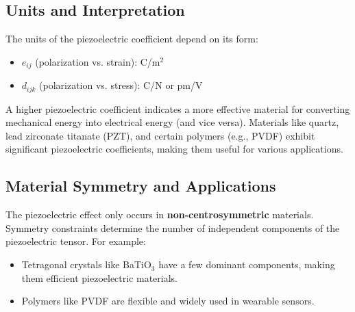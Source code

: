 \documentclass[12pt]{article}
\begin{document}
\subsection*{Units and Interpretation}
The units of the piezoelectric coefficient depend on its form:
\begin{itemize}
    \item $e_{ij}$ (polarization vs. strain): C/m$^2$
    \item $d_{ijk}$ (polarization vs. stress): C/N or pm/V
\end{itemize}

A higher piezoelectric coefficient indicates a more effective material for converting mechanical energy into electrical energy (and vice versa). Materials like quartz, lead zirconate titanate (PZT), and certain polymers (e.g., PVDF) exhibit significant piezoelectric coefficients, making them useful for various applications.

\subsection*{Material Symmetry and Applications}
The piezoelectric effect only occurs in \textbf{non-centrosymmetric} materials. Symmetry constraints determine the number of independent components of the piezoelectric tensor. For example:
\begin{itemize}
    \item Tetragonal crystals like BaTiO$_3$ have a few dominant components, making them efficient piezoelectric materials.
    \item Polymers like PVDF are flexible and widely used in wearable sensors.
\end{itemize}
\end{document}
